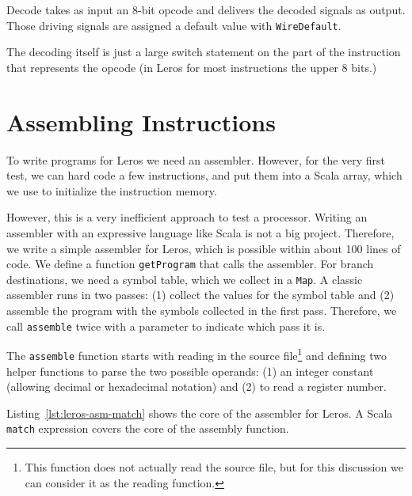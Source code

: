 \documentclass[%
    10pt,
    headinclude, footexclude,
    openright, %
    notitlepage,
    cleardoubleempty,
    headsepline,
    pointlessnumbers,
    bibtotoc, idxtotoc,
    ]{scrbook}
\newcommand{\code}[1]{{\small{\texttt{#1}}}}
\newcommand{\todo}[1]{{\emph{TODO: #1}}}
\renewcommand{\todo}[1]{}
\begin{document}

\noindent Decode takes as input an 8-bit opcode and delivers the decoded signals
as output. Those driving signals are assigned a default value with \code{WireDefault}.


\noindent The decoding itself is just a large switch statement on the part of the
instruction that represents the opcode (in Leros for most instructions the upper
8 bits.)


\section{Assembling Instructions}


To write programs for Leros we need an assembler. However, for the very first
test, we can hard code a few instructions, and put them into a Scala array,
which we use to initialize the instruction memory.


\noindent However, this is a very inefficient approach to test a processor.
Writing an assembler with an expressive language like Scala is not a big project.
Therefore, we write a simple assembler for Leros, which is possible within about
100 lines of code. We define a function \code{getProgram} that calls the assembler.
For branch destinations, we need a symbol table, which we collect in a \code{Map}.
A classic assembler runs in two passes: (1) collect the values for the symbol table
and (2) assemble the program with the symbols collected in the first pass.
Therefore, we call \code{assemble} twice with a parameter to indicate which pass it is.


The \code{assemble} function starts with reading in the source
file\footnote{This function does not actually read the source file, but for this
discussion we can consider it as the reading function.}
and defining two helper functions to parse the two possible operands: (1) an
integer constant (allowing decimal or hexadecimal notation) and (2) to read
a register number.


Listing~\ref{lst:leros-asm-match} shows the core of the assembler for Leros.
A Scala \code{match} expression covers the core of the assembly function.
\todo{Some more words on the code.}
\end{document}

